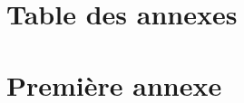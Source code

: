 \documentclass[a4paper,11pt]{report}    %
\begin{document}
\begin{appendices}

\chapter*{Table des annexes}
\startcontents[chapter]

\chapter{Première annexe}

\cite{CitekeyBook}



\end{appendices}

\end{document}
